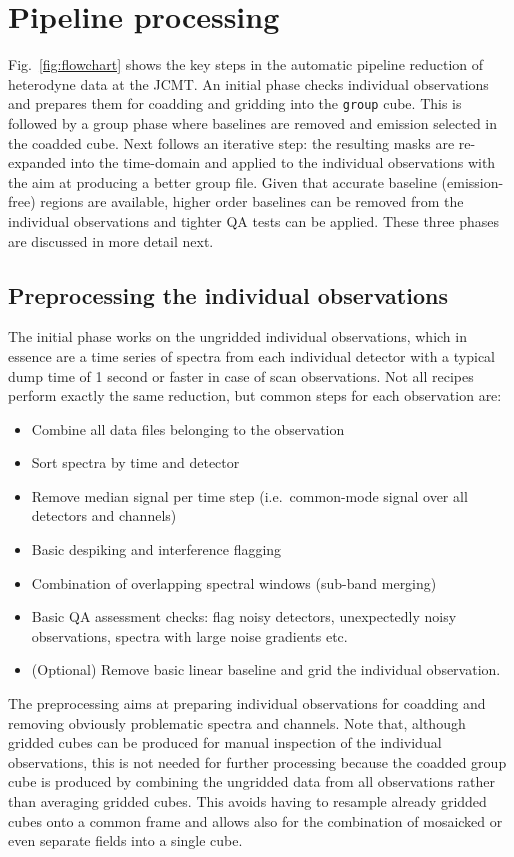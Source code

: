 \documentclass[final,authoryear,5p,times,twocolumn]{elsarticle}
\begin{document}
\section{Pipeline processing}

Fig.\ \ref{fig:flowchart} shows the key steps in the automatic
pipeline reduction of heterodyne data at the JCMT. An initial phase
checks individual observations and prepares them for coadding and
gridding into the \texttt{group} cube. This is followed by a group
phase where baselines are removed and emission selected in the coadded
cube.  Next follows an iterative step: the resulting masks are
re-expanded into the time-domain and applied to the individual
observations with the aim at producing a better group file. Given that
accurate baseline (emission-free) regions are available, higher
order baselines can be removed from the individual observations and
tighter QA tests can be applied. These three phases are discussed in
more detail next.

\subsection{Preprocessing the individual observations}

The initial phase works on the ungridded individual observations,
which in essence are a time series of spectra from each individual
detector with a typical dump time of 1 second or faster in case of scan
observations.  Not all recipes perform exactly the same reduction, but
common steps for each observation are:
\begin{itemize}
\item Combine all data files belonging to the observation
\item Sort spectra by time and detector
\item Remove median signal per time step (i.e.\ common-mode signal over
all detectors and channels)
\item Basic despiking and interference flagging
\item Combination of overlapping spectral windows (sub-band merging)
\item Basic QA assessment checks: flag noisy detectors, unexpectedly noisy
observations, spectra with large noise gradients etc.
\item (Optional) Remove basic linear baseline and grid the individual
observation.
\end{itemize}

The preprocessing aims at preparing individual observations for
coadding and removing obviously problematic spectra and channels.
Note that, although gridded cubes can be produced for manual
inspection of the individual observations, this is not needed for
further processing because the coadded group cube is produced by
combining the ungridded data from all observations rather than
averaging gridded cubes.  This avoids having to resample already
gridded cubes onto a common frame and allows also for the combination
of mosaicked or even separate fields into a single cube.
\end{document}
